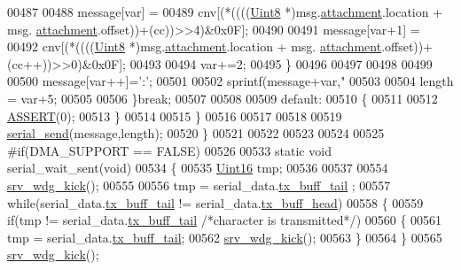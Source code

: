\begin{DoxyCode}
{{{{{00487 
00488                    message[var]   =
00489                     cnv[(*((((\hyperlink{a00072_af84840501dec18061d18a68c162a8fa2}{Uint8} *)msg.\hyperlink{a00031_a040f6d5d58d18d8aeaf447eda7f50172}{attachment}.location + msg.
      \hyperlink{a00031_a040f6d5d58d18d8aeaf447eda7f50172}{attachment}.offset))+(cc))>>4)&0x0F];
00490 
00491                    message[var+1]   =
00492                     cnv[(*((((\hyperlink{a00072_af84840501dec18061d18a68c162a8fa2}{Uint8} *)msg.\hyperlink{a00031_a040f6d5d58d18d8aeaf447eda7f50172}{attachment}.location + msg.
      \hyperlink{a00031_a040f6d5d58d18d8aeaf447eda7f50172}{attachment}.offset))+(cc++))>>0)&0x0F];
00493 
00494                    var+=2;
00495        \}
00496 
00497   
00498      
00499 
00500        message[var++]=\textcolor{charliteral}{':'};
00501 
00502        sprintf(message+var,\textcolor{stringliteral}{"%
00503 
00504        length = var+5;
00505        
00506        \}\textcolor{keywordflow}{break};
00507 
00508 
00509         \textcolor{keywordflow}{default}:
00510         \{
00511 
00512             \hyperlink{a00072_abb8ff8e213ac9f6fb21d2b968583b936}{ASSERT}(0);
00513         \}
00514 
00515  \}
00516 
00517 
00518 
00519     \hyperlink{a00030_a17f65cf9dbacdfb97cb2536ed0097ccb}{serial\_send}(message,length);
00520 \}
00521 
00522 
00523 
00524 
00525 \textcolor{preprocessor}{#if(DMA\_SUPPORT == FALSE)}
00526 
00533 \textcolor{keyword}{static} \textcolor{keywordtype}{void}  serial\_wait\_sent(\textcolor{keywordtype}{void})
00534 \{
00535     \hyperlink{a00072_a59a9f6be4562c327cbfb4f7e8e18f08b}{Uint16} tmp;
00536 
00537 
00554     \hyperlink{a00067_a710d148845397582739d170341f3d3d9}{srv\_wdg\_kick}();
00555 
00556     tmp = serial\_data.\hyperlink{a00030_a6287e1447d7902b8bbc2f6359065dcbd}{tx\_buff\_tail} ;
00557     \textcolor{keywordflow}{while}(serial\_data.\hyperlink{a00030_a6287e1447d7902b8bbc2f6359065dcbd}{tx\_buff\_tail} != serial\_data.\hyperlink{a00030_a3e2eda0a020422511de91b2bc7386083}{tx\_buff\_head})
00558     \{
00559         \textcolor{keywordflow}{if}(tmp != serial\_data.\hyperlink{a00030_a6287e1447d7902b8bbc2f6359065dcbd}{tx\_buff\_tail} \textcolor{comment}{/*character is transmitted*/})
00560         \{
00561            tmp = serial\_data.\hyperlink{a00030_a6287e1447d7902b8bbc2f6359065dcbd}{tx\_buff\_tail};
00562            \hyperlink{a00067_a710d148845397582739d170341f3d3d9}{srv\_wdg\_kick}();
00563         \}
00564     \}
00565     \hyperlink{a00067_a710d148845397582739d170341f3d3d9}{srv\_wdg\_kick}();
}}}}}}
\end{DoxyCode}
